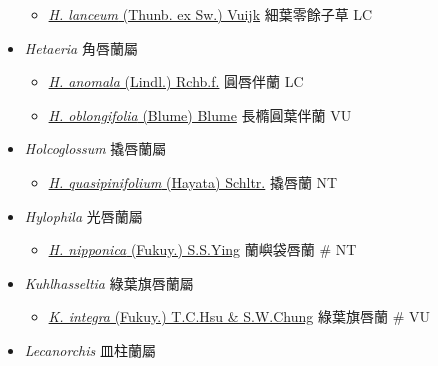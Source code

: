 \begin{itemize}
  \begin{itemize}
        \item[] \href{http://www.theplantlist.org/tpl1.1/search?q=Herminium+lanceum}{\textit{H. lanceum} (Thunb. ex Sw.) Vuijk}   細葉零餘子草   LC
  \end{itemize}
 \item[] \textit{Hetaeria} 角唇蘭屬
                                
  \begin{itemize}
        \item[] \href{http://www.theplantlist.org/tpl1.1/search?q=Hetaeria+anomala}{\textit{H. anomala} (Lindl.) Rchb.f.}   圓唇伴蘭   LC
        \item[] \href{http://www.theplantlist.org/tpl1.1/search?q=Hetaeria+oblongifolia}{\textit{H. oblongifolia} (Blume) Blume}   長橢圓葉伴蘭   VU
  \end{itemize}
 \item[] \textit{Holcoglossum} 撬唇蘭屬
                                
  \begin{itemize}
        \item[] \href{http://www.theplantlist.org/tpl1.1/search?q=Holcoglossum+quasipinifolium}{\textit{H. quasipinifolium} (Hayata) Schltr.}   撬唇蘭   NT
  \end{itemize}
 \item[] \textit{Hylophila} 光唇蘭屬
                                
  \begin{itemize}
        \item[] \href{http://www.theplantlist.org/tpl1.1/search?q=Hylophila+nipponica}{\textit{H. nipponica} (Fukuy.) S.S.Ying}   蘭嶼袋唇蘭  \# NT
  \end{itemize}
 \item[] \textit{Kuhlhasseltia} 綠葉旗唇蘭屬
                                
  \begin{itemize}
        \item[] \href{http://www.theplantlist.org/tpl1.1/search?q=Kuhlhasseltia+integra}{\textit{K. integra} (Fukuy.) T.C.Hsu \& S.W.Chung}   綠葉旗唇蘭  \# VU
  \end{itemize}
 \item[] \textit{Lecanorchis} 皿柱蘭屬
                                

\end{itemize}
